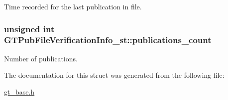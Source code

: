 \label{struct_g_t_pub_file_verification_info__st_ad850cc69e0c80addc2b113c326e463b6}
Time recorded for the last publication in file. \hypertarget{struct_g_t_pub_file_verification_info__st_aa49831cefc4796c3eeb930b6ac287940}{
\subsubsection[{publications\_\-count}]{\setlength{\rightskip}{0pt plus 5cm}unsigned int {\bf GTPubFileVerificationInfo\_\-st::publications\_\-count}}}
\label{struct_g_t_pub_file_verification_info__st_aa49831cefc4796c3eeb930b6ac287940}
Number of publications. 

The documentation for this struct was generated from the following file:\begin{DoxyCompactItemize}
\item 
\hyperlink{gt__base_8h}{gt\_\-base.h}\end{DoxyCompactItemize}

